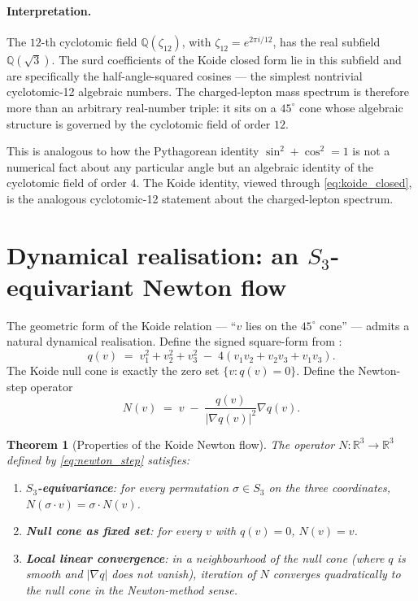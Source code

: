 \documentclass[11pt]{article}
\newtheorem{theorem}{Theorem}[section]
\theoremstyle{remark}
\begin{document}
\paragraph{Interpretation.}
The $12$-th cyclotomic field $\mathbb{Q}(\zeta_{12})$, with $\zeta_{12} = e^{2\pi i/12}$, has the real subfield $\mathbb{Q}(\sqrt{3})$.  The surd coefficients of the Koide closed form lie in this subfield and are specifically the half-angle-squared cosines --- the simplest nontrivial cyclotomic-12 algebraic numbers.  The charged-lepton mass spectrum is therefore more than an arbitrary real-number triple: it sits on a $45^\circ$ cone whose algebraic structure is governed by the cyclotomic field of order $12$.

This is analogous to how the Pythagorean identity $\sin^2 + \cos^2 = 1$ is not a numerical fact about any particular angle but an algebraic identity of the cyclotomic field of order $4$.  The Koide identity, viewed through \eqref{eq:koide_closed}, is the analogous cyclotomic-12 statement about the charged-lepton spectrum.

\section{Dynamical realisation: an \texorpdfstring{$S_3$}{S3}-equivariant Newton flow}
\label{sec:dynamical}

The geometric form of the Koide relation --- ``$v$ lies on the $45^\circ$ cone'' --- admits a natural dynamical realisation.  Define the signed square-form from :
\begin{equation}
q(v) \;=\; v_1^2 + v_2^2 + v_3^2 \;-\; 4(v_1 v_2 + v_2 v_3 + v_1 v_3).
\end{equation}
The Koide null cone is exactly the zero set $\{v : q(v) = 0\}$.  Define the Newton-step operator
\begin{equation}
N(v) \;=\; v \;-\; \frac{q(v)}{|\nabla q(v)|^2}\nabla q(v).
\label{eq:newton_step}
\end{equation}

\begin{theorem}[Properties of the Koide Newton flow]
\label{thm:newton}
The operator $N: \mathbb{R}^3 \to \mathbb{R}^3$ defined by \eqref{eq:newton_step} satisfies:
\begin{enumerate}[leftmargin=1.3em,itemsep=0.05em]
  \item \textbf{$S_3$-equivariance}: for every permutation $\sigma \in S_3$ on the three coordinates, $N(\sigma \cdot v) = \sigma \cdot N(v)$.
  \item \textbf{Null cone as fixed set}: for every $v$ with $q(v) = 0$, $N(v) = v$.
  \item \textbf{Local linear convergence}: in a neighbourhood of the null cone (where $q$ is smooth and $|\nabla q|$ does not vanish), iteration of $N$ converges quadratically to the null cone in the Newton-method sense.
\end{enumerate}
\end{theorem}
\end{document}
